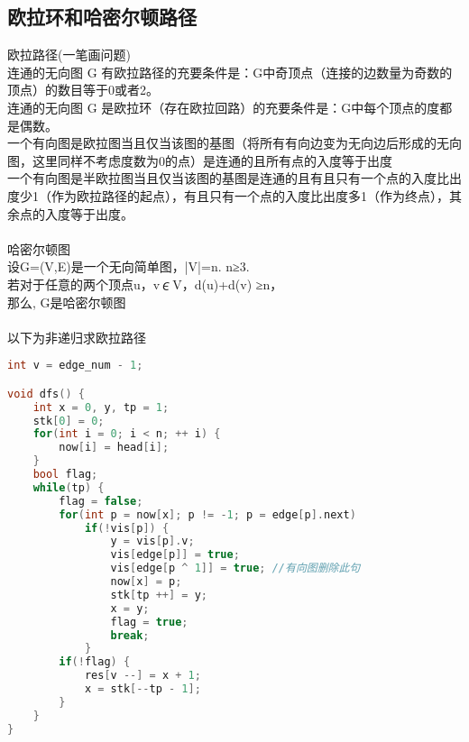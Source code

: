 \subsection{欧拉环和哈密尔顿路径}
    欧拉路径(一笔画问题)\\
    连通的无向图 G 有欧拉路径的充要条件是：G中奇顶点（连接的边数量为奇数的顶点）的数目等于0或者2。\\
    连通的无向图 G 是欧拉环（存在欧拉回路）的充要条件是：G中每个顶点的度都是偶数。\\
    一个有向图是欧拉图当且仅当该图的基图（将所有有向边变为无向边后形成的无向图，这里同样不考虑度数为0的点）是连通的且所有点的入度等于出度\\
    一个有向图是半欧拉图当且仅当该图的基图是连通的且有且只有一个点的入度比出度少1（作为欧拉路径的起点），有且只有一个点的入度比出度多1（作为终点），其余点的入度等于出度。\\
    \\
    哈密尔顿图 \\
    设G=(V,E)是一个无向简单图，|V|=n.  n≥3. \\
    若对于任意的两个顶点u，v∊V，d(u)+d(v) ≥n，\\
    那么, G是哈密尔顿图\\
    \\
    以下为非递归求欧拉路径\\
    \begin{lstlisting}[language=c++]
int v = edge_num - 1;

void dfs() {
    int x = 0, y, tp = 1;
    stk[0] = 0;
    for(int i = 0; i < n; ++ i) {
        now[i] = head[i];
    }
    bool flag;
    while(tp) {
        flag = false;
        for(int p = now[x]; p != -1; p = edge[p].next)
            if(!vis[p]) {
                y = vis[p].v;
                vis[edge[p]] = true;
                vis[edge[p ^ 1]] = true; //有向图删除此句
                now[x] = p;
                stk[tp ++] = y;
                x = y;
                flag = true;
                break;
            }
        if(!flag) {
            res[v --] = x + 1;
            x = stk[--tp - 1];
        }
    }
}
    \end{lstlisting}

